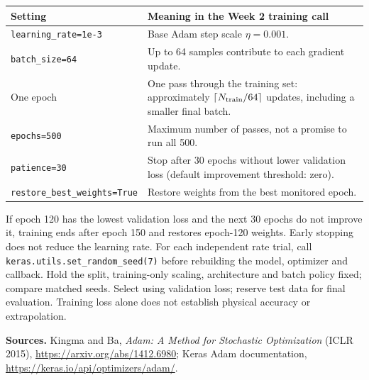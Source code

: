 \begin{center}\begin{tabular}{p{.31\linewidth}p{.61\linewidth}}\toprule
Setting & Meaning in the Week 2 training call\\\midrule
\texttt{learning\_rate=1e-3} & Base Adam step scale $\eta=0.001$.\\
\texttt{batch\_size=64} & Up to 64 samples contribute to each gradient update.\\
One epoch & One pass through the training set: approximately $\lceil N_{\rm train}/64\rceil$ updates, including a smaller final batch.\\
\texttt{epochs=500} & Maximum number of passes, not a promise to run all 500.\\
\texttt{patience=30} & Stop after 30 epochs without lower validation loss (default improvement threshold: zero).\\
\texttt{restore\_best\_weights=True} & Restore weights from the best monitored epoch.\\\bottomrule
\end{tabular}\end{center}
If epoch 120 has the lowest validation loss and the next 30 epochs do not improve it, training ends after epoch 150 and restores epoch-120 weights. Early stopping does not reduce the learning rate. For each independent rate trial, call \texttt{keras.utils.set\_random\_seed(7)}
before rebuilding the model, optimizer and callback. Hold the split,
training-only scaling, architecture and batch policy fixed; compare matched seeds. Select using validation loss; reserve test data for final evaluation.
Training loss alone does not establish physical accuracy or extrapolation.

\textbf{Sources.} Kingma and Ba, \emph{Adam: A Method for Stochastic Optimization}
(ICLR 2015), \url{https://arxiv.org/abs/1412.6980}; Keras Adam documentation,
\url{https://keras.io/api/optimizers/adam/}.
\clearpage

